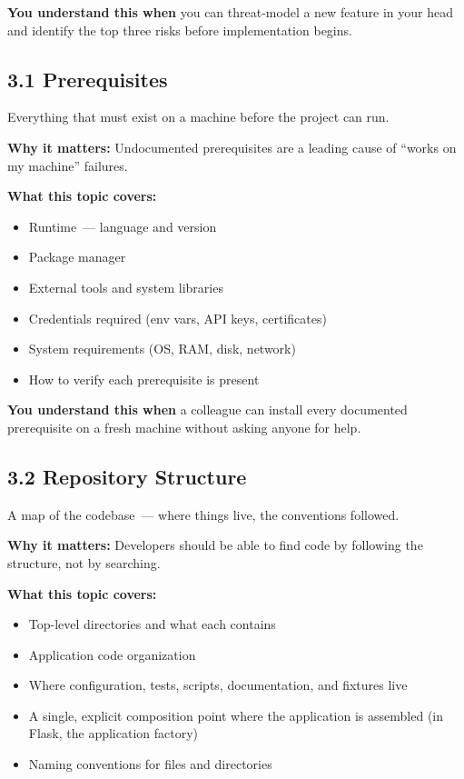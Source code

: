 \noindent{}\textbf{You understand this when} you can threat-model a new feature in your head and identify the top three risks before implementation begins.

\label{project-planning-guide:section-3--developer-guide}

\subsection*{3.1 Prerequisites}\label{project-planning-guide:31-prerequisites}

Everything that must exist on a machine before the project can run.

\textbf{Why it matters:} Undocumented prerequisites are a leading cause of ``works on my machine'' failures.

\textbf{What this topic covers:}

\begin{itemize}
\tightlist
\item
  Runtime~--- language and version
\item
  Package manager
\item
  External tools and system libraries
\item
  Credentials required (env vars, API keys, certificates)
\item
  System requirements (OS, RAM, disk, network)
\item
  How to verify each prerequisite is present
\end{itemize}

\noindent{}\textbf{You understand this when} a colleague can install every documented prerequisite on a fresh machine without asking anyone for help.

\subsection*{3.2 Repository Structure}\label{project-planning-guide:32-repository-structure}

A map of the codebase~--- where things live, the conventions followed.

\textbf{Why it matters:} Developers should be able to find code by following the structure, not by searching.

\textbf{What this topic covers:}

\begin{itemize}
\tightlist
\item
  Top-level directories and what each contains
\item
  Application code organization
\item
  Where configuration, tests, scripts, documentation, and fixtures live
\item
  A single, explicit composition point where the application is assembled (in Flask, the application factory)
\item
  Naming conventions for files and directories
\end{itemize}

